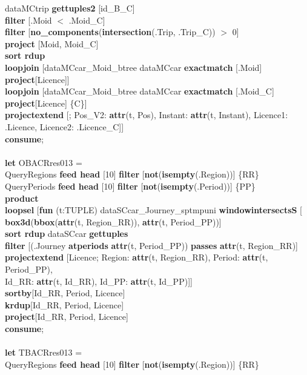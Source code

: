 \documentclass[a4paper]{article}
\newcommand{\op}[1]{\textbf{#1}}
\begin{document}
\begin{scriptsize}
\begin{tabbing}
\>\>dataMCtrip \op{gettuples2} [id\_B\_C]\\
\>\>\op{filter} [.Moid $<$ .Moid\_C]\\
\>\>\op{filter} [\op{no\_components}(\op{intersection}(.Trip, .Trip\_C)) $>$ 0]\\
\>\>\op{project} [Moid, Moid\_C]\\
\>\>\op{sort rdup}\\
\>\>\op{loopjoin} [dataMCcar\_Moid\_btree dataMCcar \op{exactmatch} [.Moid] \op{project}[Licence]]\\
\>\>\op{loopjoin} [dataMCcar\_Moid\_btree dataMCcar \op{exactmatch} [.Moid\_C] \op{project}[Licence] \{C\}]\\
\>\>\op{projectextend} [; Pos\_V2: \op{attr}(t, Pos), Instant: \op{attr}(t, Instant), Licence1: .Licence, Licence2: .Licence\_C]]\\
\op{consume};\\
\\
\op{let} OBACRres013 =\\
\>QueryRegions \op{feed head} [10] \op{filter} [\op{not}(\op{isempty}(.Region))] \{RR\}\\
\>QueryPeriods \op{feed head} [10] \op{filter} [\op{not}(\op{isempty}(.Period))] \{PP\}\\
\>\op{product}\\
\>\op{loopsel} [\op{fun} (t:TUPLE) dataSCcar\_Journey\_sptmpuni \op{windowintersectsS} [\\
\>\>\>\op{box3d}(\op{bbox}(\op{attr}(t, Region\_RR)), \op{attr}(t, Period\_PP))]\\
\>\>\op{sort rdup} dataSCcar  \op{gettuples}\\
\>\>\op{filter} [(.Journey \op{atperiods} \op{attr}(t, Period\_PP)) \op{passes} \op{attr}(t, Region\_RR)]\\
\>\>\op{projectextend} [Licence; Region: \op{attr}(t, Region\_RR), Period: \op{attr}(t, Period\_PP),\\
\>\>\>\>Id\_RR: \op{attr}(t, Id\_RR), Id\_PP: \op{attr}(t, Id\_PP)]]\\
\>\op{sortby}[Id\_RR, Period, Licence]\\
\>\op{krdup}[Id\_RR, Period, Licence]\\
\>\op{project}[Id\_RR, Period, Licence]\\
\op{consume};\\
\\
\op{let} TBACRres013 =\\
\>QueryRegions \op{feed head} [10] \op{filter} [\op{not}(\op{isempty}(.Region))] \{RR\}\\

\end{tabbing}
\end{scriptsize}
\end{document}

